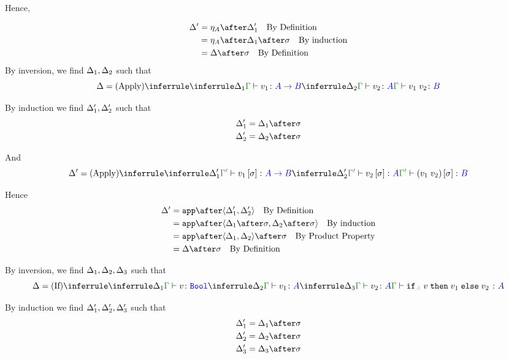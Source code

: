 \documentclass{report}
\begin{document}
Hence,

\begin{align*}
    \D' & = \point{A}\after\D_1'\qt{By Definition}\\
    & = \point{A}\after\D_1\after\si\qt{By induction}\\
    & = \D\after\si\qt{By Definition}\\
\end{align*}
By inversion, we find $\Delta_1, \Delta_2$ such that
\begin{equation}
    \D = \ntreeruleII{Apply}{\treeruleI{\D_1}{\typerelation{\G}{v_1}{\ab}}}{\treeruleI{\D_2}{\typerelation{\G}{v_2}{A}}}{\typerelation{\G}{\apply{v_1}{v_2}}{B}}
\end{equation}

By induction we find $\Delta_1', \Delta_2'$ such that 
\begin{align*}
    \D_1' &= \D_1\after\si\\
    \D_2' &= \D_2\after\si\\
\end{align*}

And
\begin{equation}
    \D' = \ntreeruleII{Apply}{\treeruleI{\D_1'}{\typerelation{\G'}{v_1\ssi}{\ab}}}{\treeruleI{\D_2'}{\typerelation{\G'}{v_2\ssi}{A}}}{\typerelation{\G'}{(\apply{v_1}{v_2})\ssi}{B}}
\end{equation}

Hence
\begin{align*}
    \D' &= \app\after\pr{\D_1'}{\D_2'}\qt{By Definition}\\
        &= \app\after\pr{\D_1\after\si}{\D_2\after\si}\qt{By induction}\\
        &= \app\after\pr{\D_1}{\D_2}\after\si\qt{By Product Property}\\
        & = \D\after\si\qt{By Definition}\\
\end{align*}



By inversion, we find $\Delta_1, \Delta_2, \Delta_3$ such that
\begin{equation}
    \D = \ntreeruleIII{If}{\treeruleI{\D_1}{\typerelation{\G}{v}{\B}}}{\treeruleI{\D_2}{\typerelation{\G}{v_1}{ A}}}{\treeruleI{\D_3}{\typerelation{\G}{v_2}{ A}}}{\typerelation{\G}{\pifthenelse{A}{v}{v_1}{v_2}}{ A}}
\end{equation}

By induction we find $\Delta_1', \Delta_2', \Delta_3'$ such that 
\begin{align*}
    \D_1' &= \D_1\after\si\\
    \D_2' &= \D_2\after\si\\
    \D_3' &= \D_3\after\si\\
\end{align*}
\end{document}
